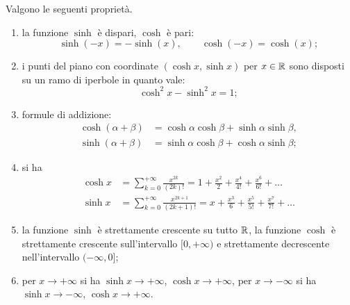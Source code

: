\begin{theorem}
Valgono le seguenti proprietà.
\begin{enumerate}
\item
la funzione $\sinh$ è dispari, $\cosh$ è pari:
\[
\sinh(-x) = -\sinh(x),
\qquad
\cosh(-x) = \cosh(x);
\]

\item
i punti del piano con coordinate $(\cosh x, \sinh x)$
per $x\in {\mathbb R}$
sono disposti su un ramo di iperbole in quanto vale:
\[
  \cosh^2 x - \sinh^2 x = 1;
\]

\item formule di addizione:
\begin{align*}
  \cosh(\alpha+\beta) &= \cosh \alpha \cosh \beta + \sinh \alpha \sinh \beta,\\
  \sinh(\alpha+\beta) &= \sinh \alpha \cosh \beta + \cosh \alpha \sinh \beta;
\end{align*}

\item si ha
\begin{align*}
  \cosh x
  &= \sum_{k=0}^{+\infty} \frac{x^{2k}}{(2k)!}
  = 1 + \frac{x^2}{2} + \frac{x^4}{4!} + \frac{x^6}{6!} + \dots \\
  \sinh x
  &= \sum_{k=0}^{+\infty} \frac{x^{2k+1}}{(2k+1)!}
  = x + \frac{x^3}{6} + \frac{x^5}{5!} + \frac{x^7}{7!} + \dots
\end{align*}

\item
la funzione $\sinh$ è strettamente crescente su tutto ${\mathbb R}$,
la funzione $\cosh$
è strettamente crescente sull'intervallo
$[0,+\infty)$ e strettamente decrescente
nell'intervallo $(-\infty,0]$;

\item per $x\to +\infty$ si ha $\sinh x \to +\infty$, $\cosh x \to +\infty$, 
per $x\to -\infty$ si ha $\sinh x \to -\infty$, $\cosh x \to +\infty$.

\end{enumerate}
\end{theorem}

